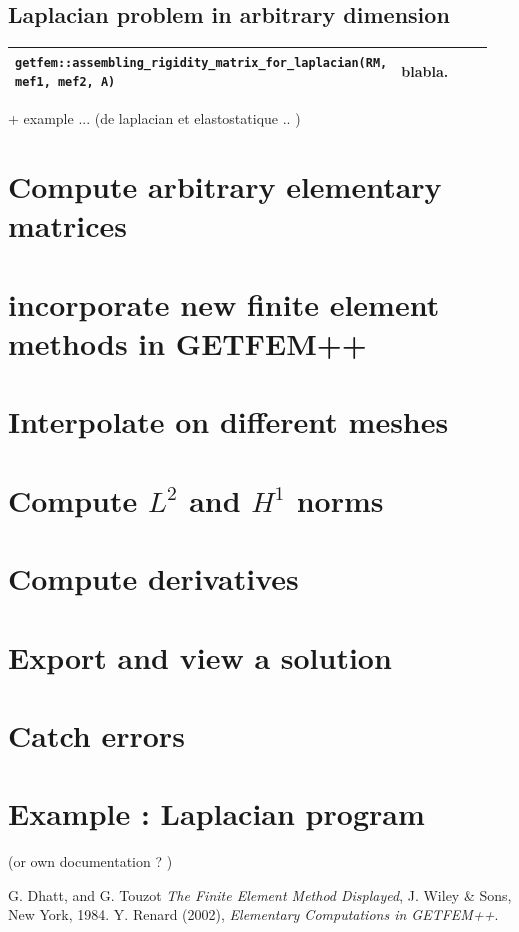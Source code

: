 \documentclass[11pt,a4paper]{article}
\begin{document}
\subsection{Laplacian problem in arbitrary dimension}



\begin{center} \begin{tabular}{|m{0.4\linewidth}|m{0.55\linewidth}|} \hline

  {\tt getfem::assembling\_rigidity\_matrix\_for\_laplacian(RM, mef1, mef2, A)} & blabla.  \\ \hline

\end{tabular} \end{center}

+ example ... (de laplacian et elastostatique .. )

\section{Compute arbitrary elementary matrices}

\section{incorporate new finite element methods in GETFEM++}

\section{Interpolate on different meshes}

\section{Compute $L^2$ and $H^1$ norms}

\section{Compute derivatives}

\section{Export and view a solution}

\section{Catch errors}

\section{Example : Laplacian program} (or own documentation ? )


\begin{thebibliography}{99}
% 
% 
% 
  G. {\sc Dhatt, and  G. Touzot}
  {\it The Finite Element Method Displayed}, 
 J. Wiley \& Sons,  New York, 1984.
  Y. {\sc Renard} (2002),
  {\it Elementary Computations in GETFEM++}.
\end{thebibliography}
\end{document}
